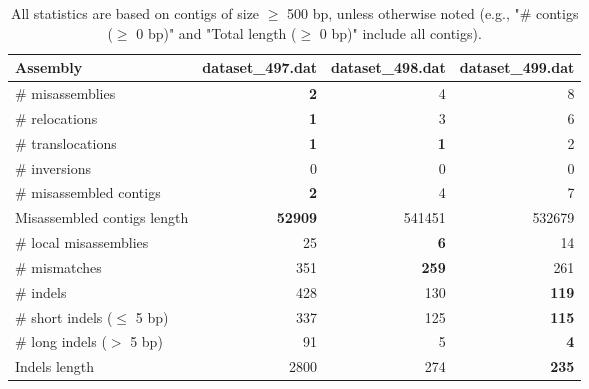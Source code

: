 \documentclass[12pt,a4paper]{article}
\begin{document}
\begin{table}[ht]
\begin{center}
\caption{All statistics are based on contigs of size $\geq$ 500 bp, unless otherwise noted (e.g., "\# contigs ($\geq$ 0 bp)" and "Total length ($\geq$ 0 bp)" include all contigs).}
\begin{tabular}{|l*{3}{|r}|}
\hline
Assembly & dataset\_497.dat & dataset\_498.dat & dataset\_499.dat \\ \hline
\# misassemblies & {\bf 2} & 4 & 8 \\ \hline
\hspace{5mm}\# relocations & {\bf 1} & 3 & 6 \\ \hline
\hspace{5mm}\# translocations & {\bf 1} & {\bf 1} & 2 \\ \hline
\hspace{5mm}\# inversions & 0 & 0 & 0 \\ \hline
\# misassembled contigs & {\bf 2} & 4 & 7 \\ \hline
Misassembled contigs length & {\bf 52909} & 541451 & 532679 \\ \hline
\# local misassemblies & 25 & {\bf 6} & 14 \\ \hline
\# mismatches & 351 & {\bf 259} & 261 \\ \hline
\# indels & 428 & 130 & {\bf 119} \\ \hline
\hspace{5mm}\# short indels ($\leq$ 5 bp) & 337 & 125 & {\bf 115} \\ \hline
\hspace{5mm}\# long indels ($>$ 5 bp) & 91 & 5 & {\bf 4} \\ \hline
Indels length & 2800 & 274 & {\bf 235} \\ \hline
\end{tabular}
\end{center}
\end{table}
\end{document}
